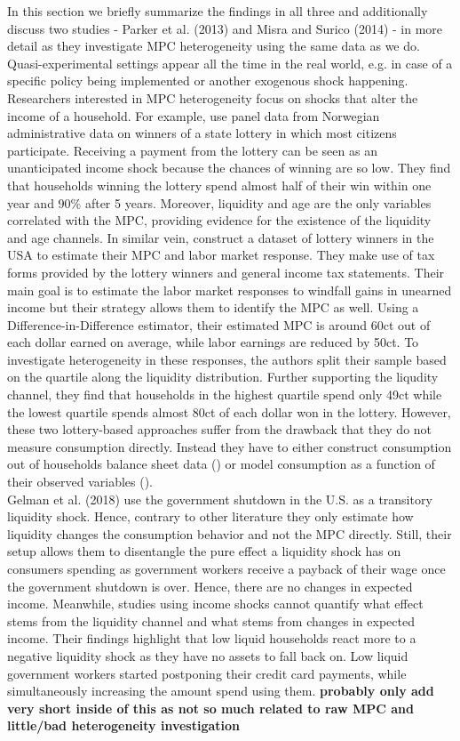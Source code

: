 In this section we briefly summarize the findings in all three and additionally discuss two studies - Parker et al. (2013) and Misra and Surico (2014) - in more detail as they investigate MPC heterogeneity using the same data as we do. \\
Quasi-experimental settings appear all the time in the real world, e.g. in case of a specific policy being implemented or another exogenous shock happening. Researchers interested in MPC heterogeneity focus on shocks that alter the income of a household. For example, \cite{fagereng_etal} use panel data from Norwegian administrative data on winners of a state lottery in which most citizens participate. Receiving a payment from the lottery can be seen as an unanticipated income shock because the chances of winning are so low. They find that households winning the lottery spend almost half of their win within one year and 90\% after 5 years. Moreover, liquidity and age are the only variables correlated with the MPC, providing evidence for the existence of the liquidity and age channels. In similar vein, \cite{golosov_etal} construct a dataset of lottery winners in the USA to estimate their MPC and labor market response. They make use of tax forms provided by the lottery winners and general income tax statements. Their main goal is to estimate the labor market responses to windfall gains in unearned income but their strategy allows them to identify the MPC as well. Using a Difference-in-Difference estimator, their estimated MPC is around 60ct out of each dollar earned on average, while labor earnings are reduced by 50ct. To investigate heterogeneity in these responses, the authors split their sample based on the quartile along the liquidity distribution. Further supporting the liqudity channel, they find that households in the highest quartile spend only 49ct while the lowest quartile spends almost 80ct of each dollar won in the lottery. However, these two lottery-based approaches suffer from the drawback that they do not measure consumption directly. Instead they have to either construct consumption out of households balance sheet data (\cite{fagereng_etal}) or model consumption as a function of their observed variables (\cite{golosov_etal}). \\
Gelman et al. (2018) use the government shutdown in the U.S. as a transitory liquidity shock. Hence, contrary to other literature they only estimate how liquidity changes the consumption behavior and not the MPC directly. Still, their setup allows them to disentangle the pure effect a liquidity shock has on consumers spending as government workers receive a payback of their wage once the government shutdown is over. Hence, there are no changes in expected income. Meanwhile, studies using income shocks cannot quantify what effect stems from the liquidity channel and what stems from changes in expected income. Their findings highlight that low liquid households react more to a negative liquidity shock as they have no assets to fall back on. Low liquid government workers started postponing their credit card payments, while simultaneously increasing the amount spend using them. \textbf{probably only add very short inside of this as not so much related to raw MPC and little/bad heterogeneity investigation} \\
